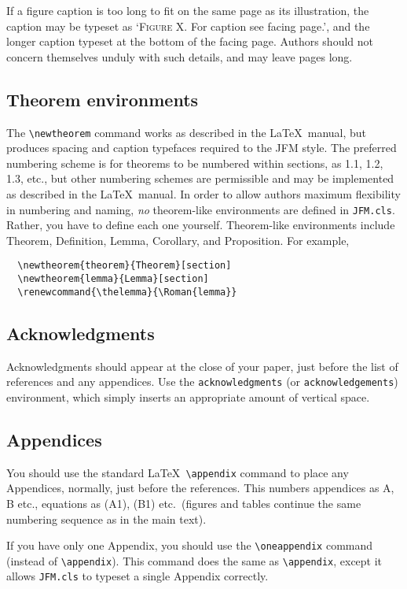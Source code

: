 \documentclass{jfm}
\newcommand\etc{etc.\ }
\begin{document}
If a figure caption is too long to fit on the same page as its illustration,
the caption may be typeset as `{\small\textsc{Figure X.} \textrm{For caption
see facing page.}}', and the longer caption typeset at the bottom of the
facing page. Authors should not concern themselves unduly with such details,
and may leave pages long.

\subsection{Theorem environments}\label{sectTheor}

The \verb"\newtheorem" command works as described in the \LaTeX\ manual,
but produces spacing and caption typefaces required to the JFM style.  The
preferred numbering scheme is for theorems to be numbered within sections,
as 1.1, 1.2, 1.3, etc., but other numbering schemes are permissible and
may be implemented as described in the \LaTeX\ manual.  In order to allow
authors maximum flexibility in numbering and naming, \emph{no} theorem-like
environments are defined in \verb"JFM.cls".  Rather, you have to define
each one yourself.  Theorem-like environments include Theorem, Definition,
Lemma, Corollary, and Proposition.  For example,
%
\begin{verbatim}
  \newtheorem{theorem}{Theorem}[section]
  \newtheorem{lemma}{Lemma}[section]
  \renewcommand{\thelemma}{\Roman{lemma}}
\end{verbatim}

\subsection{Acknowledgments}

Acknowledgments should appear at the close of your paper, just before
the list of references and any appendices.  Use the \verb"acknowledgments"
(or \verb"acknowledgements") environment, which simply inserts an appropriate
amount of vertical space.

\subsection{Appendices}

You should use the standard \LaTeX\ \verb"\appendix" command to place any
Appendices, normally, just before the references. This numbers
appendices as A, B etc., equations as (A1), (B1) \etc (figures and
tables continue the same numbering sequence as in the main text).

If you have only one Appendix, you should use the \verb"\oneappendix" command
(instead of \verb"\appendix"). This command does the same as \verb"\appendix",
except it allows \verb"JFM.cls" to typeset a single Appendix correctly.
\end{document}

